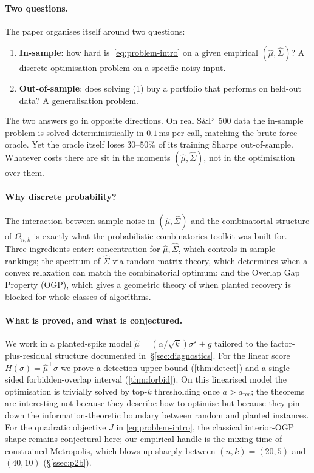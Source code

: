 \documentclass[11pt]{article}
\begin{document}
\paragraph{Two questions.} The paper organises itself around two questions:
\begin{enumerate}\itemsep=2pt
\item \textbf{In-sample}: how hard is~\eqref{eq:problem-intro} on a given empirical
$(\hat\mu,\hat\Sigma)$? A discrete optimisation problem on a specific noisy input.
\item \textbf{Out-of-sample}: does solving (1) buy a portfolio that performs on
held-out data? A generalisation problem.
\end{enumerate}
The two answers go in opposite directions. On real S\&P~500 data
the in-sample problem is solved deterministically in $0.1$\,ms per call,
matching the brute-force oracle. Yet the oracle itself loses $30$--$50\%$ of its
training Sharpe out-of-sample. Whatever costs there are sit in the moments
$(\hat\mu,\hat\Sigma)$, not in the optimisation over them.

\paragraph{Why discrete probability?} The interaction between sample noise in
$(\hat\mu,\hat\Sigma)$ and the combinatorial structure of $\Omega_{n,k}$ is exactly what
the probabilistic-combinatorics toolkit was built for. Three ingredients enter:
concentration for $\hat\mu,\hat\Sigma$, which controls in-sample rankings; the spectrum
of $\hat\Sigma$ via random-matrix theory, which determines when a convex relaxation can
match the combinatorial optimum; and the Overlap Gap Property
(OGP), which gives a geometric theory of when
planted recovery is blocked for whole classes of algorithms.

\paragraph{What is proved, and what is conjectured.} We work in a planted-spike model
$\hat\mu = (\alpha/\sqrt k)\sigma^\star + g$ tailored to the factor-plus-residual
structure documented in~\S\ref{sec:diagnostics}. For the linear score
$H(\sigma)=\hat\mu^\top\sigma$ we prove a detection upper bound
(\cref{thm:detect}) and a single-sided forbidden-overlap interval (\cref{thm:forbid}).
On this linearised model the optimisation is trivially solved by top-$k$ thresholding
once $a>a_{\mathrm{rec}}$; the theorems are interesting not because they describe how
to optimise but because they pin down the information-theoretic boundary between random
and planted instances. For the quadratic objective $J$ in \eqref{eq:problem-intro}, the
classical interior-OGP shape remains conjectural here;
our empirical handle is the mixing time of constrained Metropolis, which blows up
sharply between $(n,k)=(20,5)$ and $(40,10)$ (\S\ref{ssec:p2b}).
\end{document}
